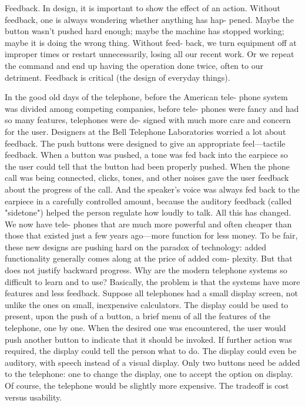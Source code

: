 \documentclass[11pt]{article}
\begin{document}
Feedback. In design, it is important to show the effect of an action. Without feedback, one is always wondering whether anything has hap- pened. Maybe the button wasn't pushed hard enough; maybe the machine has stopped working; maybe it is doing the wrong thing. Without feed- back, we turn equipment off at improper times or restart unnecessarily, losing all our recent work. Or we repeat the command and end up having the operation done twice, often to our detriment. Feedback is critical (the design of everyday things).

In the good old days of the telephone, before the American tele- phone system was divided among competing companies, before tele- phones were fancy and had so many features, telephones were de- signed with much more care and concern for the user. Designers at the Bell Telephone Laboratories worried a lot about feedback. The push buttons were designed to give an appropriate feel—tactile feedback. When a button was pushed, a tone was fed back into the earpiece so the user could tell that the button had been properly pushed. When the phone call was being connected, clicks, tones, and other noises gave the user feedback about the progress of the call. And the speaker's voice was always fed back to the earpiece in a carefully controlled amount, because the auditory feedback (called "sidetone") helped the person regulate how loudly to talk. All this has changed. We now have tele- phones that are much more powerful and often cheaper than those that existed just a few years ago—more function for less money. To be fair, these new designs are pushing hard on the paradox of technology: added functionality generally comes along at the price of added com- plexity. But that does not justify backward progress. 
Why are the modern telephone systems so difficult to learn and to use? Basically, the problem is that the systems have more features and less feedback. Suppose all telephones had a small display screen, not unlike the ones on small, inexpensive calculators. The display could be used to present, upon the push of a button, a brief menu of all the features of the telephone, one by one. When the desired one was encountered, the user would push another button to indicate that it should be invoked. If further action was required, the display could tell the person what to do. The display could even be auditory, with speech instead of a visual display. Only two buttons need be added to the 
telephone: one to change the display, one to accept the option on display. Of course, the telephone would be slightly more expensive. The tradeoff is cost versus usability.
\end{document}
